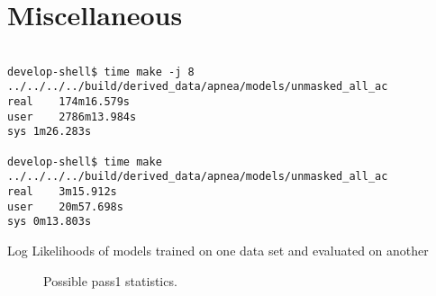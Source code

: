 \documentclass[12pt]{article}
\begin{document}
\section{Miscellaneous}
\label{sec:misc}
\begin{verbatim}

develop-shell$ time make -j 8 ../../../../build/derived_data/apnea/models/unmasked_all_ac  
real	174m16.579s
user	2786m13.984s
sys	1m26.283s

develop-shell$ time make ../../../../build/derived_data/apnea/models/unmasked_all_ac
real	3m15.912s
user	20m57.698s
sys	0m13.803s

\end{verbatim}

\begin{table}
  \centering
   
  \caption[Log Likelihoods]{Log Likelihoods of models trained on one
    data set and evaluated on another}
  \label{tab:log_likelihoods}
\end{table}

\begin{figure}
  \centering
    \caption{Possible pass1 statistics.}
  \label{fig:statistics}
\end{figure}
\end{document}
